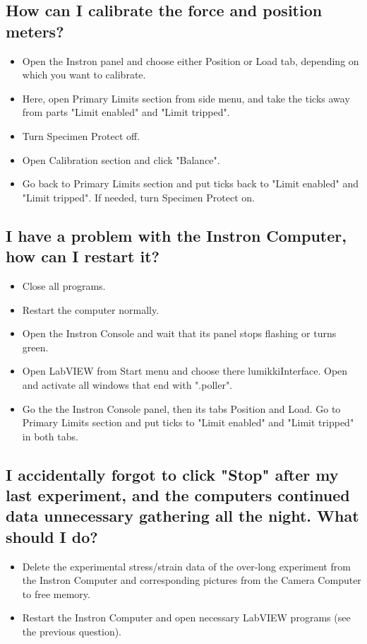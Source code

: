 \documentclass[a4paper]{article}
\begin{document}
\subsection{How can I calibrate the force and position meters?}

\begin{itemize}  
  \item Open the Instron panel and choose either Position or Load tab, depending on which you want to calibrate.
  \item Here, open Primary Limits section from side menu, and take the ticks away from parts "Limit enabled" and "Limit tripped".
  \item Turn Specimen Protect off.
  \item Open Calibration section and click "Balance".
  \item Go back to Primary Limits section and put ticks back to "Limit enabled" and "Limit tripped". If needed, turn Specimen Protect on.
\end{itemize}

\subsection{I have a problem with the Instron Computer, how can I restart it?}

\begin{itemize}  
  \item Close all programs.
  \item Restart the computer normally.
  \item Open the Instron Console and wait that its panel stops flashing or turns green.
  \item Open LabVIEW from Start menu and choose there lumikkiInterface. Open and activate all windows that end with ".poller".
  \item Go the the Instron Console panel, then its tabs Position and Load. Go to Primary Limits section and put ticks to "Limit enabled" and "Limit tripped" in both tabs.
\end{itemize}

\subsection{I accidentally forgot to click "Stop" after my last experiment, and the computers continued data unnecessary gathering all the night. What should I do?}

\begin{itemize}  
  \item Delete the experimental stress/strain data of the over-long experiment from the Instron Computer and corresponding pictures from the Camera Computer to free memory.
  \item Restart the Instron Computer and open necessary LabVIEW programs (see the previous question).
\end{itemize}
\end{document}
